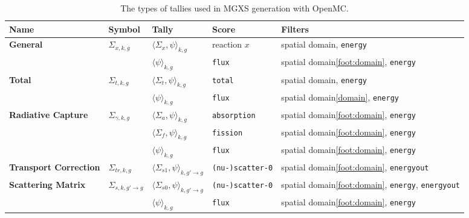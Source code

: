 \begin{table}[h!]
  \centering
  \caption[Tally types for MGXS generation]{The types of tallies used in MGXS generation with OpenMC.}
  \scriptsize
  \label{tab:tally-types}
  \vspace{6pt}
  \begin{tabular}{ m{2.3cm} m{1.2cm} m{2cm} m{2.5cm} l }
  \toprule
  {\bf Name} &
  {\bf Symbol} &
  {\bf Tally} &
  {\bf Score} &
  {\bf Filters} \\

  \midrule

  \multirow{2}{*}{\bf General} & \multirow{2}{*}{$\Sigma_{x,k,g}$} & $\langle \Sigma_{x}, \psi \rangle_{k,g}$ & reaction $x$ & spatial domain\footnotemark, \texttt{energy} \\
  \cline{3-5}
  & & $\langle \psi \rangle_{k,g}$ & {\texttt{flux}} & spatial domain\ref{foot:domain}, \texttt{energy} \\

  \midrule

  \multirow{2}{*}{\bf Total} & \multirow{2}{*}{$\Sigma_{t,k,g}$} & $\langle \Sigma_{t}, \psi \rangle_{k,g}$ & \texttt{total} & spatial domain, \texttt{energy} \\
  \cline{3-5}
  & & $\langle \psi \rangle_{k,g}$ & \texttt{flux} & spatial domain\ref{domain}, \texttt{energy} \\

  \midrule

  \multirow{3}{*}{\parbox{1.5cm}{\bf Radiative Capture}} & \multirow{3}{*}{$\Sigma_{\gamma,k,g}$} & $\langle \Sigma_{a}, \psi \rangle_{k,g}$ & \texttt{absorption} & spatial domain\ref{foot:domain}, \texttt{energy} \\
  \cline{3-5}
  & & $\langle \Sigma_{f}, \psi \rangle_{k,g}$ & \texttt{fission} & spatial domain\ref{foot:domain}, \texttt{energy} \\
  \cline{3-5}
  & & $\langle \psi \rangle_{k,g}$ & \texttt{flux} & spatial domain\ref{foot:domain}, \texttt{energy} \\

  \midrule

  \textbf{\parbox{1.5cm}{\bf Transport Correction}} & $\Sigma_{tr,k,g}$ & $\langle \Sigma_{s1}, \psi \rangle_{k,g'\rightarrow g}$ & \texttt{(nu-)scatter-0} & spatial domain\ref{foot:domain}, \texttt{energyout} \\

  \midrule

  \multirow{2}{*}{\parbox{1.5cm}{\bf Scattering Matrix}} & \multirow{2}{*}{$\Sigma_{s,k,g'\rightarrow g}$} & $\langle \Sigma_{s0}, \psi \rangle_{k,g'\rightarrow g}$ & \texttt{(nu-)scatter-0} & spatial domain\ref{foot:domain}, \texttt{energy}, \texttt{energyout} \\
  \cline{3-5}
  & & $\langle \psi \rangle_{k,g}$ & \texttt{flux} & spatial domain\ref{foot:domain}, \texttt{energy} \\


\end{tabular}
\end{table}

